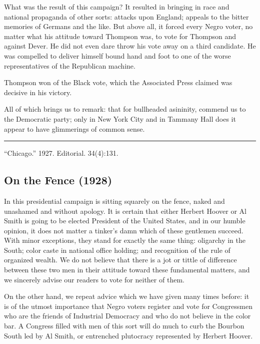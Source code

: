 \documentclass[letterpaper,10pt,english]{jupyterBook}
\begin{document}
\sphinxAtStartPar
What was the result of this campaign? It resulted in bringing in race and national propaganda of other sorts: attacks upon England; appeals to the bitter memories of Germans and the like. But above all, it forced every Negro voter, no matter what his attitude toward Thompson was, to vote for Thompson and against Dever. He did not even dare throw his vote away on a third candidate. He was compelled to deliver himself bound hand and foot to one of the worse representatives of the Republican machine.

\begin{sphinxShadowBox}
\sphinxstylesidebartitle{}

\sphinxAtStartPar
Thompson won  of the Black vote, which the Associated Press claimed was decisive in his victory.
\end{sphinxShadowBox}

\sphinxAtStartPar
All of which brings us to remark: that for bull\sphinxhyphen{}headed asininity, commend us to the Democratic party; only in New York City and in Tammany Hall does it appear to have glimmerings of common sense.


\bigskip\hrule\bigskip


\sphinxAtStartPar
{} “Chicago.” 1927. Editorial.  34(4):131.


\subsection{On the Fence (1928)}
\label{\detokenize{Volumes/35/11/on_the_fence:on-the-fence-1928}}\label{\detokenize{Volumes/35/11/on_the_fence::doc}}
\sphinxAtStartPar
In this presidential campaign  is sitting squarely on the fence, naked and unashamed and without apology. It is certain that either Herbert Hoover or Al Smith is going to be elected President of the United States, and in our humble opinion, it does not matter a tinker’s damn which of these gentlemen succeed. With minor exceptions, they stand for exactly the same thing: oligarchy in the South; color caste in national office holding; and recognition of the rule of organized wealth. We do not believe that there is a jot or tittle of difference between these two men in their attitude toward these fundamental matters, and we sincerely advise our readers to vote for neither of them.

\sphinxAtStartPar
On the other hand, we repeat advice which we have given many times before: it is of the utmost importance that Negro voters register and vote for Congressmen who are the friends of Industrial Democracy and who do not believe in the color bar. A Congress filled with men of this sort will do much to curb the Bourbon South led by Al Smith, or entrenched plutocracy represented by Herbert Hoover.
\end{document}
